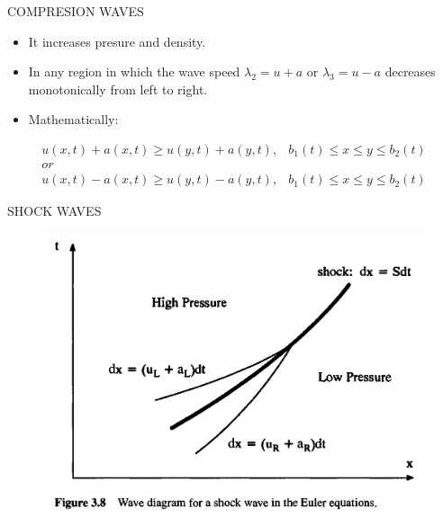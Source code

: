 \documentclass{beamer}
\begin{document}
\begin{frame}{COMPRESION WAVES}
  \begin{itemize}
   \item It increases presure and density.
   \item In any region in which the wave speed $\lambda_2=u+a$ or $\lambda_3=u-a$ decreases monotonically from left to right. 
   \item Mathematically:
  \end{itemize}
  \begin{equation}
  \begin{matrix}
   u(x,t)+a(x,t)\geq{u(y,t)+a(y,t)}, & b_1(t)\leq{x}\leq{y}\leq{b_2(t)}\\
   or \\
   u(x,t)-a(x,t)\geq{u(y,t)-a(y,t)}, & b_1(t)\leq{x}\leq{y}\leq{b_2(t)}
  \end{matrix}
  \end{equation}
\end{frame}

\begin{frame}{SHOCK WAVES}
  \begin{figure}
   \includegraphics[scale=0.32]{figures/shockwdiag.jpg}
  \end{figure}
\end{frame}
\end{document}
